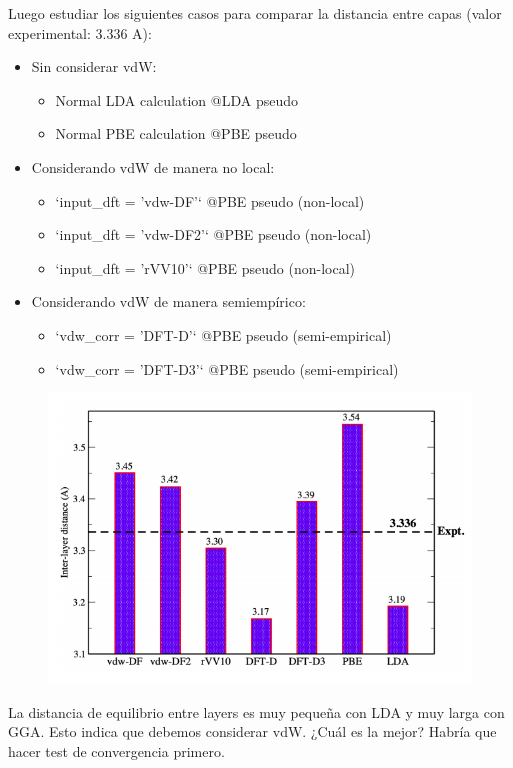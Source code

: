   Luego estudiar los siguientes casos para comparar la distancia entre capas (valor experimental: 3.336 A):
  \begin{itemize}
    \item Sin considerar vdW:
      \begin{itemize}
        \item Normal LDA calculation   @LDA pseudo
        \item Normal PBE calculation   @PBE pseudo
      \end{itemize}
    \item Considerando vdW de manera no local:
      \begin{itemize}
        \item `input\_dft = 'vdw-DF'`    @PBE pseudo (non-local)
        \item `input\_dft = 'vdw-DF2'`   @PBE pseudo (non-local)
        \item `input\_dft = 'rVV10'`     @PBE pseudo (non-local)
      \end{itemize}
    \item Considerando vdW de manera semiempírico:
      \begin{itemize}
        \item `vdw\_corr  = 'DFT-D'`     @PBE pseudo (semi-empirical)
        \item `vdw\_corr  = 'DFT-D3'`    @PBE pseudo (semi-empirical)
      \end{itemize}
  \end{itemize}


  \begin{figure}[H]
      \centering
      \includegraphics[scale = 0.5]{figs/D4/vdW.png}
  \end{figure}

  La distancia de equilibrio entre layers es muy pequeña con LDA y muy larga con GGA. Esto indica que debemos considerar vdW. ¿Cuál es la mejor? Habría que hacer test de convergencia primero.
